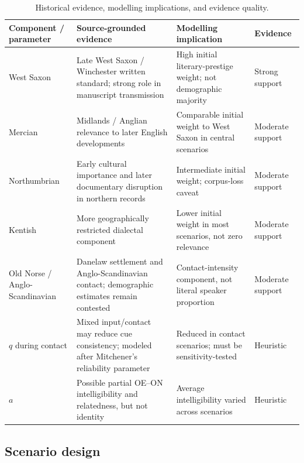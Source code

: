 \documentclass[11pt]{article}
\begin{document}
\begin{table}[h]
\centering
\caption{Historical evidence, modelling implications, and evidence quality.}
\label{tab:evidence}
\scriptsize
\begin{tabular}{p{}p{}p{}p{}}
\toprule
Component / parameter & Source-grounded evidence & Modelling implication & Evidence \\
\midrule
West Saxon & Late West Saxon / Winchester written standard; strong role in manuscript transmission \citep{gneuss1972standard,hofstetter1988winchester,gretsch2001winchester} & High initial literary-prestige weight; not demographic majority & Strong support \\
Mercian & Midlands / Anglian relevance to later English developments \citep{hogg1992cambridge,baugh2012history} & Comparable initial weight to West Saxon in central scenarios & Moderate support \\
Northumbrian & Early cultural importance and later documentary disruption in northern records \citep{hogg1992cambridge,baugh2012history} & Intermediate initial weight; corpus-loss caveat & Moderate support \\
Kentish & More geographically restricted dialectal component \citep{hogg1992cambridge,baugh2012history} & Lower initial weight in most scenarios, not zero relevance & Moderate support \\
Old Norse / Anglo-Scandinavian & Danelaw settlement and Anglo-Scandinavian contact; demographic estimates remain contested \citep{kershawroyvik2016people,raffield2020danelaw} & Contact-intensity component, not literal speaker proportion & Moderate support \\
$q$ during contact & Mixed input/contact may reduce cue consistency; modeled after Mitchener's reliability parameter \citep{mitchener2003bifurcation} & Reduced in contact scenarios; must be sensitivity-tested & Heuristic \\
$a$ & Possible partial OE--ON intelligibility and relatedness, but not identity \citep{townend2002language} & Average intelligibility varied across scenarios & Heuristic \\
\bottomrule
\end{tabular}
\end{table}

\subsection{Scenario design}
\end{document}
